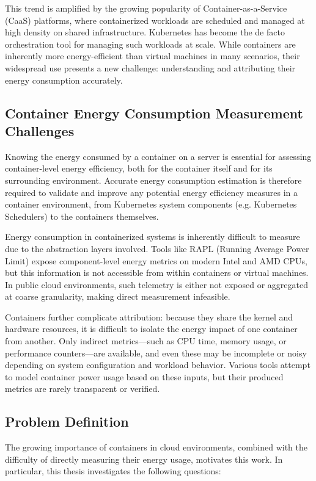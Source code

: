 This trend is amplified by the growing popularity of Container-as-a-Service (CaaS) platforms, where containerized workloads are scheduled and managed at high density on shared infrastructure. Kubernetes has become the de facto orchestration tool for managing such workloads at scale. While containers are inherently more energy-efficient than virtual machines in many scenarios\parencite{Morabito2015}, their widespread use presents a new challenge: understanding and attributing their energy consumption accurately.

\subsection{Container Energy Consumption Measurement Challenges}

Knowing the energy consumed by a container on a server is essential for assessing container-level energy efficiency, both for the container itself and for its surrounding environment. Accurate energy consumption estimation is therefore required to validate and improve any potential energy efficiency measures in a container environment, from Kubernetes system components (e.g. Kubernetes Schedulers) to the containers themselves.

Energy consumption in containerized systems is inherently difficult to measure due to the abstraction layers involved. Tools like RAPL (Running Average Power Limit) expose component-level energy metrics on modern Intel and AMD CPUs, but this information is not accessible from within containers or virtual machines. In public cloud environments, such telemetry is either not exposed or aggregated at coarse granularity, making direct measurement infeasible.

Containers further complicate attribution: because they share the kernel and hardware resources, it is difficult to isolate the energy impact of one container from another. Only indirect metrics—such as CPU time, memory usage, or performance counters—are available, and even these may be incomplete or noisy depending on system configuration and workload behavior. Various tools attempt to model container power usage based on these inputs, but their produced metrics are rarely transparent or verified.

\subsection{Problem Definition}

The growing importance of containers in cloud environments, combined with the difficulty of directly measuring their energy usage, motivates this work. In particular, this thesis investigates the following questions:

